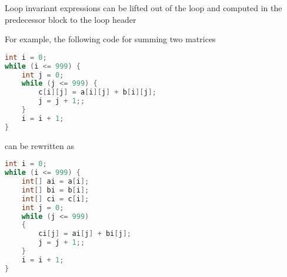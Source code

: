 \documentclass[8pt,a4paper,compress]{beamer}
\begin{document}
\begin{frame}[fragile]
\pause

Loop invariant expressions can be lifted out of the loop and computed in the predecessor block to the loop header

\pause
\bigskip

For example, the following \jmm code for summing two matrices
\begin{lstlisting}[language=Java,style=focusin]
int i = 0;
while (i <= 999) {
    int j = 0;
    while (j <= 999) {
        c[i][j] = a[i][j] + b[i][j];
        j = j + 1;;
    }
    i = i + 1;
}
\end{lstlisting}

can be rewritten as 

\begin{lstlisting}[language=Java,style=focusin]
int i = 0;
while (i <= 999) {
    int[] ai = a[i];
    int[] bi = b[i];
    int[] ci = c[i];
    int j = 0;
    while (j <= 999)
    {
        ci[j] = ai[j] + bi[j];
        j = j + 1;;
    }
    i = i + 1;
}
\end{lstlisting}
\end{frame}
\end{document}
